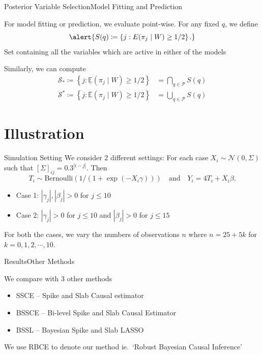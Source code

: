 \documentclass[aspectratio=169]{beamer}					%
\begin{document}
\begin{frame}{Posterior Variable Selection}{Model Fitting and Prediction}

For model fitting or prediction, we evaluate point-wise. For any fixed $q$, we define
\begin{equation}
	\alert{S(q)\coloneqq
	\left\{j : E(\pi_j\mid W) \ge 1/2\right\}.}
\end{equation}
\alert{Set containing all the variables which are active in
either of the models}

Similarly, we can compute
\begin{align}
    \mathcal{S}_*\coloneqq \left\{j:\underline{\mathbb{E}} (\pi_j\mid W)\ge1/2\right\}
    &= \bigcap_{q\in \mathcal{P}}S(q)
    \\
    \mathcal{S}^*\coloneqq \left\{j:\overline{\mathbb{E}} (\pi_j\mid W)\ge1/2\right\}
    &= \bigcup_{q\in \mathcal{P}}S(q)
\end{align}
\end{frame}
\fi

\section{Illustration}
\begin{frame}{Simulation Setting}
 We consider 2 different settings: For each case $X_i\sim\mathcal{N}(0, \Sigma)$
 such that $\left[\Sigma\right]_{ij} = 0.3 ^{|i-j|}$. Then
\begin{equation}
    T_i \sim \text{Bernoulli}\left(1/(1+\exp(-X_i\gamma))\right)
    \quad\text{and}\quad
    Y_i = 4T_i + X_i\beta.
\end{equation}

\begin{itemize}
    \item Case 1: $|\gamma_j|, |\beta_j|>0$ for $j\le 10$
    \item Case 2: $|\gamma_j|>0$ for $j\le 10$ and $|\beta_j|>0$ for $j\le 15$
\end{itemize}

For both the cases, we vary the numbers of observations $n$ where
$n=25 + 5k$ for $k=0,1,2,\cdots,10$.

\end{frame}

\begin{frame}{Results}{Other Methods}

We compare with 3 other methods

\begin{itemize}
    \item SSCE -- Spike and Slab Causal estimator
    \item BSSCE -- Bi-level Spike and Slab Causal Estimator
    \item BSSL -- Bayesian Spike and Slab LASSO
\end{itemize}

\vspace{2em}
We use RBCE to denote our method ie.~`Robust Bayesian Causal Inference'

\end{frame}
\end{document}
